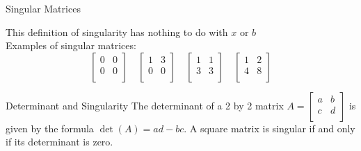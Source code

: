 \documentclass[10pt]{beamer}
\begin{document}
\begin{frame}{Singular Matrices}


{}

\vspace{0.5cm}
This definition of singularity has nothing to do with $x$ or $b$\\
\vspace{0.5cm}
Examples of singular matrices:
    $$
    \begin{bmatrix}
    0 & 0 \\ 
    0 & 0 \\
    \end{bmatrix}
    \quad
    \begin{bmatrix}
    1 & 3 \\ 
    0 & 0 \\
    \end{bmatrix} 
    \quad
    \begin{bmatrix}
    1 & 1 \\ 
    3 & 3 \\
    \end{bmatrix} 
    \quad
    \begin{bmatrix}
    1 & 2 \\ 
    4 & 8 \\
    \end{bmatrix} 
    $$

\begin{block}{Determinant and Singularity}
The determinant of a 2 by 2 matrix  $A=\begin{bmatrix}
    a & b \\ 
    c & d \\
    \end{bmatrix}$
is given by the formula $\det(A) = ad-bc$. A square matrix is singular if and only if
its determinant is zero.
\end{block}
\end{frame}


\end{document}

